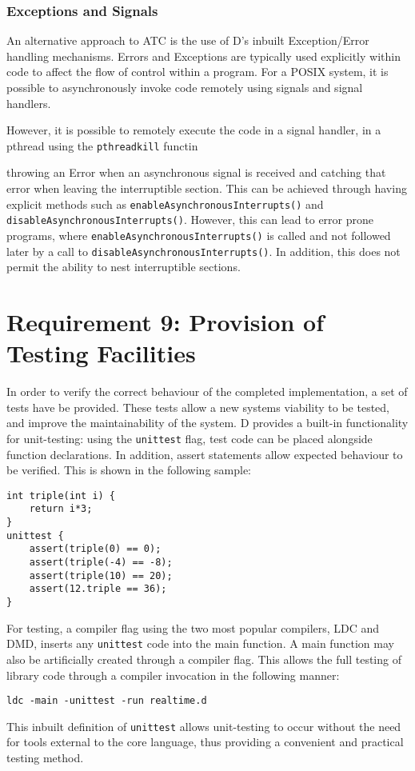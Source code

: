 \subsubsection*{Exceptions and Signals}
An alternative approach to ATC is the use of D's inbuilt Exception/Error 
handling mechanisms. Errors and Exceptions are typically used explicitly within code 
to affect the flow of control within a program.
For a POSIX system, it is possible to asynchronously invoke code remotely using 
signals and signal handlers. 

However, it is possible to remotely execute the code in a signal handler,
in a pthread using the \texttt{pthread\textunderscore{}kill}
functin

throwing an Error when an asynchronous signal is received and 
catching that error when leaving the interruptible section. This can be 
achieved through having explicit methods such as \texttt{enableAsynchronousInterrupts()}
and \texttt{disableAsynchronousInterrupts()}. However, this can lead to error 
prone programs, where \texttt{enableAsynchronousInterrupts()} is called and not 
followed later by a call to \texttt{disableAsynchronousInterrupts()}. 
In addition, this does not permit the ability to nest interruptible sections. 

\section{Requirement 9: Provision of Testing Facilities}
In order to verify the correct behaviour of the completed implementation, a set 
of tests have be provided. These tests allow a new systems viability 
to be tested, and improve the maintainability of the system. D provides a built-in 
functionality for unit-testing: using the \texttt{unittest} flag, test code can 
be placed alongside function declarations. In addition, assert statements allow 
expected behaviour to be verified. 
This is shown in the following sample:
\begin{lstlisting}
int triple(int i) {
    return i*3; 
}
unittest {
    assert(triple(0) == 0); 
    assert(triple(-4) == -8); 
    assert(triple(10) == 20); 
    assert(12.triple == 36);
}
\end{lstlisting}
For testing, a compiler flag using the two most popular compilers, LDC and DMD, 
inserts any \texttt{unittest} code into the main function. A main function may 
also be artificially created through a compiler flag. This allows the 
full testing of library code through a compiler invocation in the following manner: 
\begin{lstlisting}
ldc -main -unittest -run realtime.d
\end{lstlisting}
This inbuilt definition of \texttt{unittest} allows unit-testing to occur 
without the need for tools external to the core language, thus providing a convenient 
and practical testing method. 
